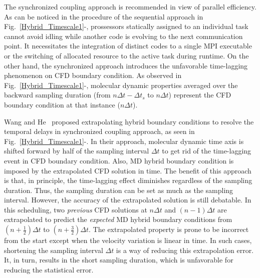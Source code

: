 \documentclass[preprint,12pt]{elsarticle}
\begin{document}
The synchronized coupling approach is recommended in view of parallel efficiency.
As can be noticed in the procedure of the sequential approach in
Fig.~\ref{Hybrid_Timescale1}-,
prossessors statically assigned to an individual task cannot avoid idling
while another code is evolving to the next communication point.
It necessitates the integration of distinct codes to a single MPI executable
or the switching of allocated resource to the active task during runtime.
On the other hand, the synchronized approach introduces the unfavorable
time-lagging phenomenon on CFD boundary condition. As observed in
Fig.~\ref{Hybrid_Timescale1}-, molecular dynamic
properties averaged over the backward sampling duration
(from $n{\Delta}t-{\Delta}t_{s}$ to $n{\Delta}t$) represent the CFD
boundary condition at that instance ($n{\Delta}t$).

Wang and He~\cite{Wang} proposed extrapolating hybrid boundary conditions
to resolve the temporal delays in synchronized coupling approach, as seen in
Fig.~\ref{Hybrid_Timescale1}-. In their approach,
molecular dynamic time axis is shifted forward by half of the sampling interval
${\Delta}t$ to get rid of the time-lagging event in CFD boundary condition.
Also, MD hybrid boundary condition is imposed by the extrapolated CFD solution
in time. The benefit of this approach is that, in principle,
the time-lagging effect diminishes regardless of the sampling duration.
Thus, the sampling duration can be set as much as the sampling interval.
However, the accuracy of the extrapolated solution is still debatable.
In this scheduling, two \textit{previous} CFD solutions
at $n{\Delta}t$ and $(n-1){\Delta}t$ are extrapolated to predict the
\textit{expected} MD hybrid boundary conditions
from $(n+\frac{1}{2}){\Delta}t$ to $(n+\frac{3}{2}){\Delta}t$.
The extrapolated property is prone to be incorrect from the start
except when the velocity variation is linear in time. In such cases, shortening the sampling
interval ${\Delta}t$ is a way of reducing this extrapolation error. It, in turn, results in
the short sampling duration, which is unfavorable for reducing the statistical error.
\end{document}
